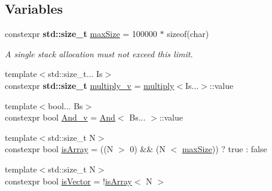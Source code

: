 \subsection*{Variables}
\begin{DoxyCompactItemize}
\item 
constexpr {\bf std\+::size\+\_\+t} \hyperlink{namespacecnt_1_1help_a0f05823dbd2465382e7961e1b69e5f51}{max\+Size} = 100000 $\ast$ sizeof(char)
\begin{DoxyCompactList}\small\item\em A single stack allocation must not exceed this limit. \end{DoxyCompactList}\end{DoxyCompactItemize}
{\bf }\par
\begin{DoxyCompactItemize}
\item 
{\footnotesize template$<$std\+::size\+\_\+t... Is$>$ }\\constexpr {\bf std\+::size\+\_\+t} \hyperlink{namespacecnt_1_1help_ab018f6aa5c1016ecf5d0d825cf8d362f}{multiply\+\_\+v} = \hyperlink{structcnt_1_1help_1_1multiply}{multiply}$<$Is...$>$\+::value
\end{DoxyCompactItemize}

{\bf }\par
\begin{DoxyCompactItemize}
\item 
{\footnotesize template$<$bool... Bs$>$ }\\constexpr bool \hyperlink{namespacecnt_1_1help_a502eecdcb745c74d4f7457265b764ef2}{And\+\_\+v} = \hyperlink{structcnt_1_1help_1_1And}{And}$<$ Bs... $>$\+::value
\end{DoxyCompactItemize}

{\bf }\par
\begin{DoxyCompactItemize}
\item 
{\footnotesize template$<$std\+::size\+\_\+t N$>$ }\\constexpr bool \hyperlink{namespacecnt_1_1help_aa31a937cfd47ea6364195d39394f8fde}{is\+Array} = ((N $>$ 0) \&\& (N $<$ \hyperlink{namespacecnt_1_1help_a0f05823dbd2465382e7961e1b69e5f51}{max\+Size})) ? true \+: false
\item 
{\footnotesize template$<$std\+::size\+\_\+t N$>$ }\\constexpr bool \hyperlink{namespacecnt_1_1help_a5d40a2583c5a58f9f4540ef0518296d5}{is\+Vector} = !\hyperlink{namespacecnt_1_1help_aa31a937cfd47ea6364195d39394f8fde}{is\+Array}$<$ N $>$
\end{DoxyCompactItemize}



